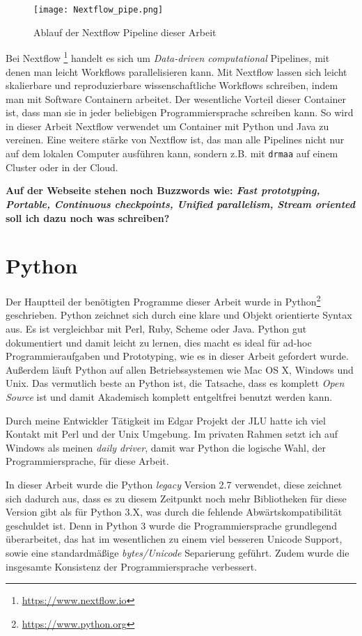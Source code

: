 \begin{figure}
\centering
\texttt{[image: Nextflow\_pipe.png]}
\caption{Ablauf der Nextflow Pipeline dieser Arbeit}
\label{fig:nextflow_pipe}
\end{figure}
Bei Nextflow \footnote{\url{https://www.nextflow.io}} handelt es sich um \emph{Data-driven computational} Pipelines, mit denen man leicht Workflows parallelisieren kann. Mit Nextflow lassen sich leicht skalierbare und reproduzierbare wissenschaftliche Workflows schreiben, indem man mit Software Containern arbeitet. Der wesentliche Vorteil dieser Container ist, dass man sie in jeder beliebigen Programmiersprache schreiben kann. So wird in dieser Arbeit Nextflow verwendet um Container mit Python und Java zu vereinen. 
Eine weitere stärke von Nextflow ist, das man alle Pipelines nicht nur auf dem lokalen Computer ausführen kann, sondern z.B. mit \texttt{drmaa} auf einem Cluster oder in der Cloud.


\textbf{Auf der Webseite stehen noch Buzzwords wie: \emph{Fast prototyping, Portable, Continuous checkpoints, Unified parallelism, Stream oriented} soll ich dazu noch was schreiben?}



\section{Python}
Der Hauptteil der benötigten Programme dieser Arbeit wurde in Python\footnote{\url{https://www.python.org}} geschrieben. Python zeichnet sich durch eine klare und Objekt orientierte Syntax aus. Es ist vergleichbar mit Perl, Ruby, Scheme oder Java. Python gut dokumentiert und damit leicht zu lernen, dies macht es ideal für ad-hoc Programmieraufgaben und Prototyping, wie es in dieser Arbeit gefordert wurde. Außerdem läuft Python auf allen Betriebssystemen wie Mac OS X, Windows und Unix. Das vermutlich beste an Python ist, die Tatsache, dass es komplett \emph{Open Source} ist und damit Akademisch komplett entgeltfrei benutzt werden kann.

Durch meine Entwickler Tätigkeit im Edgar\cite{Yu.2017} Projekt der JLU hatte ich viel Kontakt mit Perl und der Unix Umgebung. Im privaten Rahmen setzt ich auf Windows als meinen \emph{daily driver}, damit war Python die logische Wahl, der Programmiersprache, für diese Arbeit.

In dieser Arbeit wurde die Python \emph{legacy} Version 2.7 verwendet, diese zeichnet sich dadurch aus, dass es zu diesem Zeitpunkt noch mehr Bibliotheken für diese Version gibt als für Python 3.X, was durch die fehlende Abwärtskompatibilität geschuldet ist. Denn in Python 3 wurde die Programmiersprache grundlegend überarbeitet, das hat im wesentlichen zu einem viel besseren Unicode Support, sowie eine standardmäßige \emph{bytes/Unicode} Separierung geführt. Zudem wurde die insgesamte Konsistenz der Programmiersprache verbessert.


